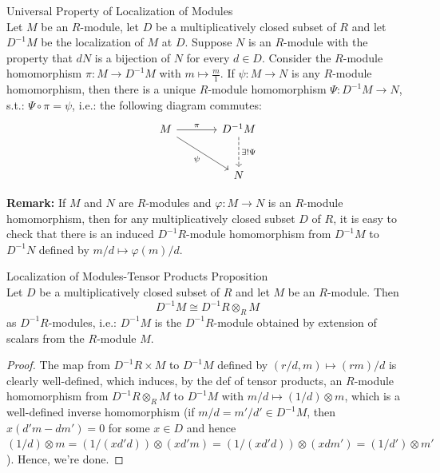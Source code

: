 \begin{theorem}{Universal Property of Localization of Modules}\\
Let $M$ be an $R$-module, let $D$ be a multiplicatively closed subset of $R$ and let $D^{-1}M$ be the localization of $M$ at $D$. Suppose $N$ is an $R$-module with the property that $dN$ is a bijection of $N$ for every $d\in D$. Consider the $R$-module homomorphism $\pi: M \to D^{-1}M$ with $m \mapsto \frac{m}{1}$. If $\psi: M\to N$ is any $R$-module homomorphism, then there is a unique $R$-module homomorphism $\Psi: D^{-1}M \to N$, s.t.: $\Psi \circ \pi =\psi$, i.e.: the following diagram commutes:
\[
\begin{tikzcd}[row sep=large, column sep=large]
    M \arrow[r, "\pi"] \arrow[dr, "\psi"'] & D^{-1}M \arrow[d, dashed, "\exists !\Psi"]\\
    &N
\end{tikzcd}
\]
\end{theorem}

\noindent\textbf{Remark:} If $M$ and $N$ are $R$-modules and $\varphi: M\to N$ is an $R$-module homomorphism, then for any multiplicatively closed subset $D$ of $R$, it is easy to check that there is an induced $D^{-1}R$-module homomorphism from $D^{-1}M$ to $D^{-1}N$ defined by $m/d \mapsto \varphi(m)/d$.

\begin{proposition}{Localization of Modules-Tensor Products Proposition}\\
Let $D$ be a multiplicatively closed subset of $R$ and let $M$ be an $R$-module. Then
$$D^{-1}M \cong D^{-1}R \otimes _RM$$
as $D^{-1}R$-modules, i.e.: $D^{-1}M$ is the $D^{-1}R$-module obtained by extension of scalars from the $R$-module $M$.
\end{proposition}

\begin{proof}
    The map from $D^{-1}R \times M $ to $ D^{-1}M$ defined by $(r/d,m) \mapsto (rm)/d$ is clearly well-defined, which induces, by the def of tensor products, an $R$-module homomorphism from $D^{-1}R \otimes_R M$ to $D^{-1}M$ with $m/d \mapsto (1/d) \otimes m$, which is a well-defined inverse homomorphism (if $m/d=m'/d' \in D^{-1}M$, then $x(d'm-dm')=0$ for some $x\in D$ and hence $(1/d) \otimes m= (1/(xd'd)) \otimes (xd'm) = (1/(xd'd)) \otimes (xdm') = (1/d') \otimes m'$). Hence, we're done.
\end{proof}

